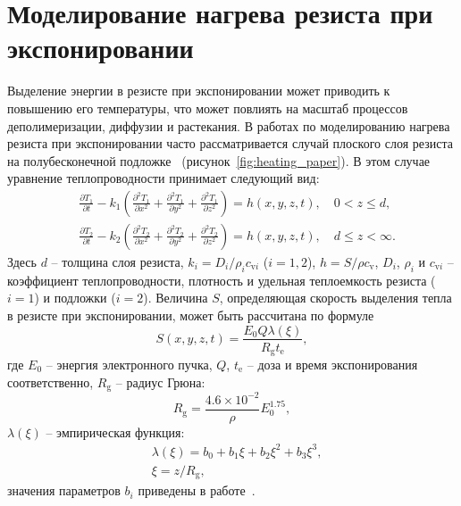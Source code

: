 \section{Моделирование нагрева резиста при экспонировании} \label{sec:sim_heating}

Выделение энергии в резисте при экспонировании может приводить к повышению его температуры, что может повлиять на масштаб процессов деполимеризации, диффузии и растекания.
В работах по моделированию нагрева резиста при экспонировании часто рассматривается случай плоского слоя резиста на полубесконечной подложке~\cite{Cui_heating} (рисунок~\ref{fig:heating_paper}).
В этом случае уравнение теплопроводности принимает следующий вид:
\begin{equation} \label{eq:heat_diffusion}
	\begin{aligned}
		& \frac{\partial T_1}{\partial t}-k_1\left(\frac{\partial^2 T_1}{\partial x^2}+\frac{\partial^2 T_1}{\partial y^2}+\frac{\partial^2 T_1}{\partial z^2}\right) = h(x, y, z, t), \quad 0 < z \leqslant d, \\
		& \frac{\partial T_2}{\partial t}-k_2\left(\frac{\partial^2 T_2}{\partial x^2}+\frac{\partial^2 T_2}{\partial y^2}+\frac{\partial^2 T_2}{\partial z^2}\right) = h(x, y, z, t), \quad d \leqslant z < \infty.
	\end{aligned}
\end{equation}
Здесь $d$ -- толщина слоя резиста, $k_i = D_i / \rho_i c_{\mathrm{v} i}$ ($i=1,2$), $h=S / \rho c_\mathrm{v}$, $D_i$, $\rho_i$ и $c_{\mathrm{v} i}$  -- коэффициент теплопроводности, плотность и удельная теплоемкость резиста ($i=1$) и подложки ($i=2$). Величина $S$, определяющая скорость выделения тепла в резисте при экспонировании, может быть рассчитана по формуле
\begin{equation}
	S(x, y, z, t)=\frac{E_0 Q \lambda(\xi)}{R_{\mathrm{g}} t_{\mathrm{e}}},
\end{equation}
где $E_0$ -- энергия электронного пучка, $Q$, $t_\mathrm{e}$ -- доза и время экспонирования соответственно, $R_\mathrm{g}$ -- радиус Грюна:
\begin{equation}
	R_{\mathrm{g}}=\frac{4.6 \times 10^{-2}}{\rho} E_0^{1.75},
\end{equation}
$\lambda(\xi)$ -- эмпирическая функция:
\begin{equation}
	\begin{aligned}
	& \lambda(\xi) = b_0+b_1 \xi+b_2 \xi^2+b_3 \xi^3, \\
	& \xi=z/R_\mathrm{g},
	\end{aligned}
\end{equation}
значения параметров $b_i$ приведены в работе~\cite{Everhart_lambda}.

